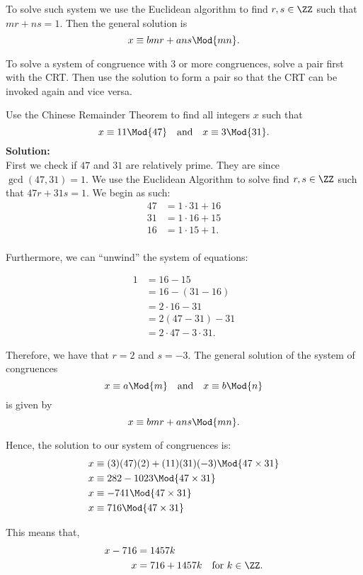 \documentclass[12pt, a4paper]{article}
\begin{document}
To solve such system we use the Euclidean algorithm to find \(r,s \in \ZZ\) such that \(mr+ns=1\). Then the general solution is 
\[x \equiv bmr+ans \Mod{mn}.\]

\begin{mdremark}
    To solve a system of congruence with \(3\) or more congruences, solve a pair first with the CRT. Then use the solution to form a pair so that the CRT can be invoked again and vice versa.
\end{mdremark}

\begin{example}
    Use the Chinese Remainder Theorem to find all integers $x$ such that 
    \[x \equiv 11 \Mod{47} \quad \text{and} \quad x\equiv 3 \Mod{31}.\]
    \textbf{Solution:} \\
    First we check if $47$ and $31$ are relatively prime. They are since $\gcd(47,31)=1.$ We use the Euclidean Algorithm to solve find $r,s \in \ZZ$ such that $47r+31s=1.$ We begin as such:
    \[\begin{aligned}
    47&=1\cdot 31+16 \\
    31&=1\cdot 16+15 \\
    16&=1\cdot 15+1. \\
    \end{aligned}\]
    
    Furthermore, we can ``unwind'' the system of equations:
    
    \[\begin{aligned}
    1 	&= 16-15 \\
        &= 16-(31-16)\\
        &= 2 \cdot 16 -31 \\
        &= 2(47-31)-31\\
        &= 2 \cdot 47 - 3\cdot 31.
    \end{aligned}\]
    
    Therefore, we have that \(r=2\) and \(s=-3\). The general solution of the system of congruences 
    $$x \equiv a \Mod{m} \quad \text{and} \quad x \equiv b \Mod{n}$$ 
    is given by 
    $$x \equiv bmr+ans \Mod{mn}.$$
    
    Hence, the solution to our system of congruences is: 
    $$\begin{aligned}
    x &\equiv (3)(47)(2)+(11)(31)(-3) \Mod{47 \times 31} \\
    x &\equiv 282-1023 \Mod{47 \times 31} \\
    x &\equiv -741 \Mod{47 \times 31} \\
    x &\equiv 716 \Mod{47 \times 31} \\
    \end{aligned}$$
    
    This means that, 
    $$\begin{aligned}
    x-716&=1457k \\
    x&=716 +1457k \quad \text{for } k\in \ZZ.
    \end{aligned}$$
\end{example}
\end{document}

